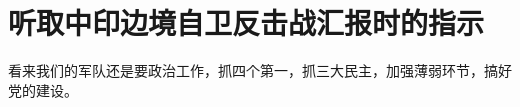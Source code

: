 \section[听取中印边境自卫反击战汇报时的指示（一九六三年二月）]{听取中印边境自卫反击战汇报时的指示}


看来我们的军队还是要政治工作，抓四个第一，抓三大民主，加强薄弱环节，搞好党的建设。

